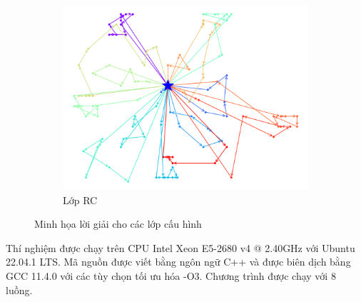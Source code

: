 \begin{figure}[H]
\begin{subfigure}{.3\textwidth}
		\includegraphics[width=1\linewidth]{figures/routes_rc101.png}
		\caption{Lớp RC}
		\label{fig:route_rc}
	\end{subfigure}
	\caption{Minh họa lời giải cho các lớp cấu hình}
\end{figure}

Thí nghiệm được chạy trên CPU Intel Xeon E5-2680 v4 @ 2.40GHz với Ubuntu 22.04.1 LTS. Mã nguồn được viết bằng ngôn ngữ C++ và được biên dịch bằng GCC 11.4.0 với các tùy chọn tối ưu hóa -O3. Chương trình được chạy với 8 luồng.





